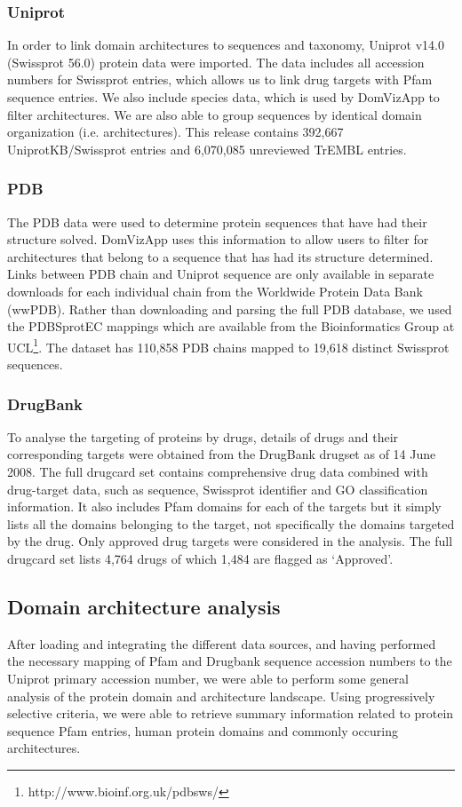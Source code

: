 \subsubsection{Uniprot}
In order to link domain architectures to sequences and taxonomy, Uniprot v14.0 (Swissprot 56.0) protein data were imported. The data includes all accession numbers for Swissprot entries, which allows us to link drug targets with Pfam sequence entries.  We also include species data, which is used by DomVizApp to filter architectures. We are also able to group sequences by identical domain organization (i.e. architectures). This release contains 392,667 UniprotKB/Swissprot entries and 6,070,085 unreviewed TrEMBL entries.

\subsubsection{PDB}
The PDB data were used to determine protein sequences that have had their structure solved. DomVizApp uses this information to allow users to filter for architectures that belong to a sequence that has had its structure determined. Links between PDB chain and Uniprot sequence are only available in separate downloads for each individual chain from the Worldwide Protein Data Bank (wwPDB). Rather than downloading and parsing the full PDB database, we used the PDBSprotEC mappings \cite{pdbsprotec} which are available from the Bioinformatics Group at UCL\footnote{http://www.bioinf.org.uk/pdbsws/}. The dataset has 110,858 PDB chains mapped to 19,618 distinct Swissprot sequences. 

\subsubsection{DrugBank}
To analyse the targeting of proteins by drugs, details of drugs and their corresponding targets were obtained from the DrugBank \cite{drugbank} drugset as of 14 June 2008. The full drugcard set contains comprehensive drug data combined with drug-target data, such as sequence, Swissprot identifier and GO classification information. It also includes Pfam domains for each of the targets but it simply lists all the domains belonging to the target, not specifically the domains targeted by the drug. Only approved drug targets were considered in the analysis. The full drugcard set lists 4,764 drugs of which 1,484 are flagged as `Approved'.


\subsection{Domain architecture analysis}
After loading and integrating the different data sources, and having performed the necessary mapping of Pfam and Drugbank sequence accession numbers to the Uniprot primary accession number, we were able to perform some general analysis of the protein domain and architecture landscape. Using progressively selective criteria, we were able to retrieve summary information related to protein sequence Pfam entries, human protein domains and commonly occuring architectures.

